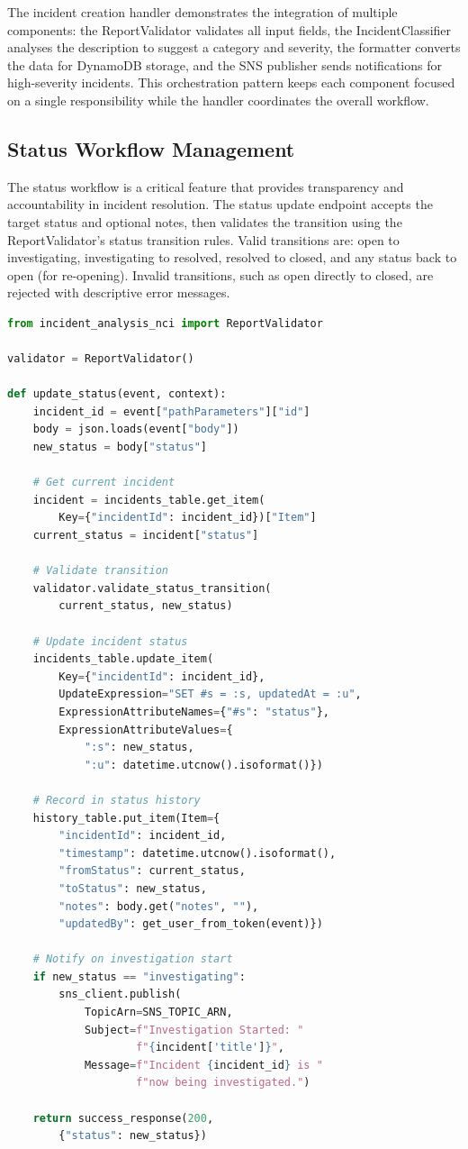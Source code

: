 \documentclass[conference]{IEEEtran}
\begin{document}
The incident creation handler demonstrates the integration of multiple components: the ReportValidator validates all input fields, the IncidentClassifier analyses the description to suggest a category and severity, the formatter converts the data for DynamoDB storage, and the SNS publisher sends notifications for high-severity incidents. This orchestration pattern keeps each component focused on a single responsibility while the handler coordinates the overall workflow.

\subsection{Status Workflow Management}

The status workflow is a critical feature that provides transparency and accountability in incident resolution. The status update endpoint accepts the target status and optional notes, then validates the transition using the ReportValidator's status transition rules. Valid transitions are: open to investigating, investigating to resolved, resolved to closed, and any status back to open (for re-opening). Invalid transitions, such as open directly to closed, are rejected with descriptive error messages.

\begin{lstlisting}[language=Python, caption={Status transition with validation and audit}]
from incident_analysis_nci import ReportValidator

validator = ReportValidator()

def update_status(event, context):
    incident_id = event["pathParameters"]["id"]
    body = json.loads(event["body"])
    new_status = body["status"]

    # Get current incident
    incident = incidents_table.get_item(
        Key={"incidentId": incident_id})["Item"]
    current_status = incident["status"]

    # Validate transition
    validator.validate_status_transition(
        current_status, new_status)

    # Update incident status
    incidents_table.update_item(
        Key={"incidentId": incident_id},
        UpdateExpression="SET #s = :s, updatedAt = :u",
        ExpressionAttributeNames={"#s": "status"},
        ExpressionAttributeValues={
            ":s": new_status,
            ":u": datetime.utcnow().isoformat()})

    # Record in status history
    history_table.put_item(Item={
        "incidentId": incident_id,
        "timestamp": datetime.utcnow().isoformat(),
        "fromStatus": current_status,
        "toStatus": new_status,
        "notes": body.get("notes", ""),
        "updatedBy": get_user_from_token(event)})

    # Notify on investigation start
    if new_status == "investigating":
        sns_client.publish(
            TopicArn=SNS_TOPIC_ARN,
            Subject=f"Investigation Started: "
                    f"{incident['title']}",
            Message=f"Incident {incident_id} is "
                    f"now being investigated.")

    return success_response(200,
        {"status": new_status})
\end{lstlisting}
\end{document}
